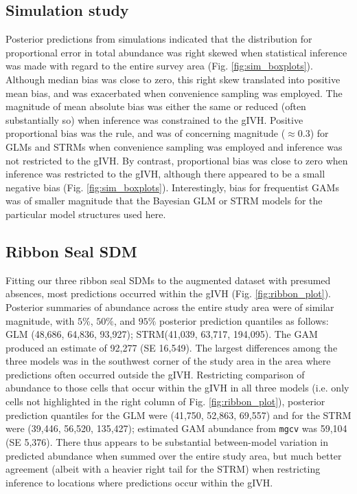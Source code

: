 \documentclass[10pt,letterpaper]{article}
\begin{document}
\subsection*{Simulation study}

Posterior predictions from simulations indicated that the distribution for proportional error in total abundance was right skewed when statistical inference was made with regard to the entire survey area (Fig. \ref{fig:sim_boxplots}).  Although median bias was close to zero, this right skew translated into positive mean bias, and was exacerbated when convenience sampling was employed. The magnitude of mean absolute bias was either the same or reduced (often substantially so) when inference was constrained to the gIVH.  Positive proportional bias was the rule, and was of concerning magnitude ($\approx 0.3$) for GLMs and STRMs when convenience sampling was employed and inference was not restricted to the gIVH.  By contrast, proportional bias was close to zero when inference was restricted to the gIVH, although there appeared to be a small negative bias (Fig. \ref{fig:sim_boxplots}).  Interestingly, bias for frequentist GAMs was of smaller magnitude that the Bayesian GLM or STRM models for the particular model structures used here.

\subsection*{Ribbon Seal SDM}

Fitting our three ribbon seal SDMs to the augmented dataset with presumed absences, most predictions occurred within the gIVH (Fig. \ref{fig:ribbon_plot}).  Posterior summaries of abundance across the entire study area were of similar magnitude, with $5\%$, $50\%$, and $95\%$ posterior prediction quantiles as follows: GLM (48,686, 64,836, 93,927); STRM(41,039, 63,717, 194,095).  The GAM produced an estimate of 92,277 (SE 16,549).  The largest differences among the three models was in the southwest corner of the study area in the area where predictions often occurred outside the gIVH.  Restricting comparison of abundance to those cells that occur within the gIVH in all three models (i.e. only cells not highlighted in the right column of Fig. \ref{fig:ribbon_plot}), posterior prediction quantiles for the GLM were (41,750, 52,863, 69,557) and for the STRM were (39,446, 56,520, 135,427); estimated GAM abundance from \texttt{mgcv} was 59,104 (SE 5,376).  There thus appears to be substantial between-model variation in predicted abundance when summed over the entire study area, but much better agreement (albeit with a heavier right tail for the STRM) when restricting inference to locations where predictions occur within the gIVH.
\end{document}
